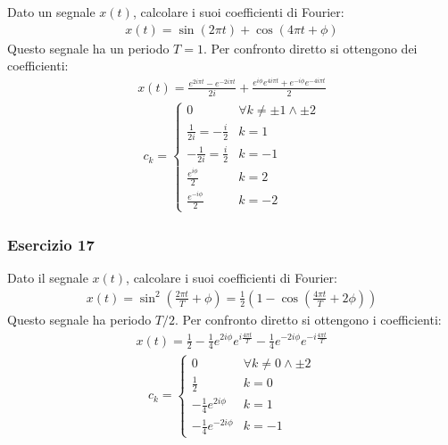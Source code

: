 \documentclass{article}
\begin{document}
Dato un segnale $x(t)$, calcolare i suoi coefficienti di Fourier:
\begin{gather*}
    x(t)=\sin\displaystyle(2\pi t)+\cos(4\pi t+\phi)
\end{gather*}
Questo segnale ha un periodo $T=1$. Per confronto diretto si ottengono dei coefficienti:
\begin{gather*}
    x(t)=\displaystyle \frac{e^{2i\pi t}-e^{-2i\pi t}}{2i}+\frac{e^{i\phi}e^{4i\pi t}+e^{-i\phi}e^{-4i\pi t}}{2}
\end{gather*}
\begin{gather}
    c_k=
    \begin{cases}
        0&\forall k\neq\pm1\land\pm2\\
        \displaystyle\frac{1}{2i}=-\frac{i}{2} &k=1\\
        -\displaystyle\frac{1}{2i}=\frac{i}{2}&k=-1\\
        \displaystyle\frac{e^{i\phi}}{2}&k=2\\
        \displaystyle\frac{e^{-i\phi}}{2}&k=-2
    \end{cases}
\end{gather}

\subsubsection*{Esercizio 17}

Dato il segnale $x(t)$, calcolare i suoi coefficienti di Fourier:
\begin{gather*}
    x(t)=\sin^2\displaystyle\left(\frac{2\pi t}{T}+\phi\right)=\frac{1}{2}\left(1-\cos\left(\frac{4\pi t}{T}+2\phi\right)\right)
\end{gather*}
Questo segnale ha periodo $T/2$. Per confronto diretto si ottengono i coefficienti:
\begin{gather*}
    x(t)=\displaystyle\frac{1}{2}-\frac{1}{4}e^{2i\phi}e^{i\frac{4\pi t}{T}}-\frac{1}{4}e^{-2i\phi}e^{-i\frac{4\pi t}{T}}
\end{gather*}
\begin{gather}
    c_k=\begin{cases}
        0&\forall k\neq0\land\pm2\\
        \displaystyle\frac{1}{2}&k=0\\
        -\displaystyle\frac{1}{4}e^{2i\phi}&k=1\\
        -\displaystyle\frac{1}{4}e^{-2i\phi}&k=-1
    \end{cases}
\end{gather}
\end{document}
